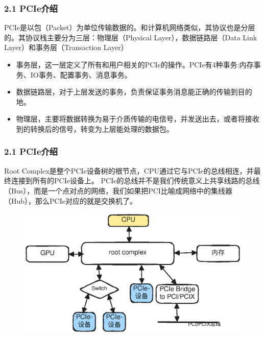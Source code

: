 \documentclass[10pt]{ctexbeamer}
\begin{document}
\begin{frame}
  \frametitle{2.1 PCIe介绍}
  PCIe是以包（Packet）为单位传输数据的。和计算机网络类似，其协议也是分层的。其协议栈主要分为三层：物理层（Physical Layer），数据链路层（Data Link Layer）和事务层（Transaction Layer）
  \begin{itemize}
    \item 事务层，这一层定义了所有和用户相关的PCIe的操作。PCIe有4种事务:内存事务、IO事务、配置事务、消息事务。
    \item 数据链路层，对于上层发送的事务，负责保证事务消息能正确的传输到目的地。
    \item 物理层，主要将数据转换为易于介质传输的电信号，并发送出去，或者将接收到的转换后的信号，转变为上层能处理的数据包。
  \end{itemize}
\end{frame}
\begin{frame}[t]
  \frametitle{2.1 PCIe介绍}
  Root Complex是整个PCIe设备树的根节点，CPU通过它与PCIe的总线相连，并最终连接到所有的PCIe设备上。
  PCIe的总线并不是我们传统意义上共享线路的总线（Bus），而是一个点对点的网络，我们如果把PCI比喻成网络中的集线器（Hub），那么PCIe对应的就是交换机了。
  \begin{figure}
    \includegraphics[width=.5\textwidth, height=.5\textheight, keepaspectratio]{images/pcie.eps}
  \end{figure}

\end{frame}
\end{document}
